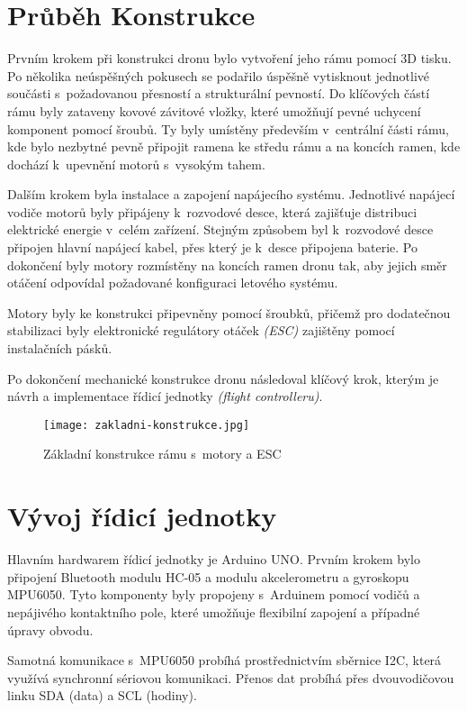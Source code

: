 \documentclass[12pt]{report}
\begin{document}
\chapter[Průběh Konstrukce]{Průběh Konstrukce}
Prvním krokem při konstrukci dronu bylo vytvoření jeho rámu pomocí 3D tisku. Po několika neúspěšných pokusech se podařilo úspěšně vytisknout jednotlivé součásti s~požadovanou přesností a strukturální pevností. Do klíčových částí rámu byly zataveny kovové závitové vložky, které umožňují pevné uchycení komponent pomocí šroubů. Ty byly umístěny především v~centrální části rámu, kde bylo nezbytné pevně připojit ramena ke středu rámu a na koncích ramen, kde dochází k~upevnění motorů s~vysokým tahem.

Dalším krokem byla instalace a zapojení napájecího systému. Jednotlivé napájecí vodiče motorů byly připájeny k~rozvodové desce, která zajišťuje distribuci elektrické energie v~celém zařízení. Stejným způsobem byl k~rozvodové desce připojen hlavní napájecí kabel, přes který je k~desce připojena baterie. Po dokončení byly motory rozmístěny na koncích ramen dronu tak, aby jejich směr otáčení odpovídal požadované konfiguraci letového systému.

Motory byly ke konstrukci připevněny pomocí šroubků, přičemž pro dodatečnou stabilizaci byly elektronické regulátory otáček \textit{(ESC)} zajištěny pomocí instalačních pásků.

Po dokončení mechanické konstrukce dronu následoval klíčový krok, kterým je návrh a implementace řídicí jednotky \textit{(flight controlleru)}.

\begin{figure}[H]
	\centering
	\texttt{[image: zakladni-konstrukce.jpg]}
	\caption{Základní konstrukce rámu s~motory a ESC}
	\label{fig:zakladni-konstrukce.jpg}
\end{figure}

\chapter[Vývoj řídicí jednotky]{Vývoj řídicí jednotky}
Hlavním hardwarem řídicí jednotky je Arduino UNO. Prvním krokem bylo připojení Bluetooth modulu HC-05 a modulu akcelerometru a gyroskopu MPU6050. Tyto komponenty byly propojeny s~Arduinem pomocí vodičů a nepájivého kontaktního pole, které umožňuje flexibilní zapojení a případné úpravy obvodu.

Samotná komunikace s~MPU6050 probíhá prostřednictvím sběrnice I2C, která využívá synchronní sériovou komunikaci. Přenos dat probíhá přes dvouvodičovou linku SDA (data) a SCL (hodiny). \cite{i2c}
\end{document}
